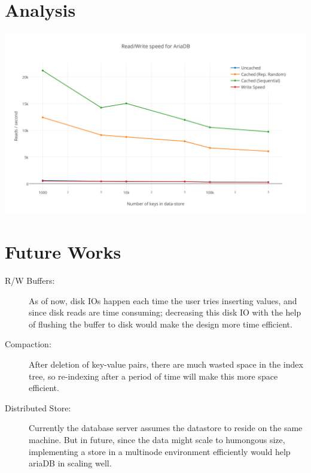 \documentclass[a0,portrait]{a0poster}
\begin{document}
\begin{multicols}{2}
\section*{Analysis}
\begin{center}
\includegraphics[width=1.0\linewidth]{rw}
\end{center}
\section*{Future Works}
\begin{description}
  \item[R/W Buffers:] As of now, disk IOs happen each time the user tries inserting values, and since disk reads are time consuming; decreasing this disk IO with the help of flushing the buffer to disk would make the design more time efficient.  
  \item[Compaction:] After deletion of key-value pairs, there are much wasted space in the index tree, so re-indexing after a period of time will make this more space efficient.
  \item[Distributed Store:] Currently the database server assumes the datastore to reside on the same machine. But in future, since the data might scale to humongous size, implementing a store in a multinode environment efficiently would help ariaDB in scaling well.
\end{description}
\nocite{*}




\end{multicols}
\end{document}
